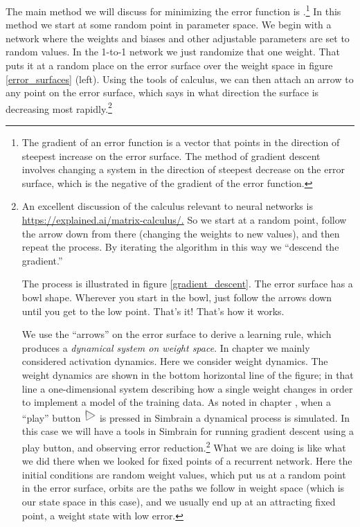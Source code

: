 The main method we will discuss for minimizing the error function is  .\footnote{The gradient of an error function is a vector that points in the direction of steepest increase on the error surface. The method of gradient descent involves changing a system in the direction of steepest decrease on the error surface, which is the negative of the gradient of the error function.}  In this method we start at some random point in parameter space. We begin with a network where the weights and biases and other adjustable parameters are set to random values. In the 1-to-1 network we just randomize that one weight. That puts it at a random place on the error surface over the weight space in figure \ref{error_surfaces} (left). Using the tools of calculus, we can then attach an arrow to any point on the error surface, which says in what direction the surface is decreasing most rapidly.\footnote{An excellent discussion of the calculus relevant to neural networks is \url{https://explained.ai/matrix-calculus/.} So we start at a random point, follow the arrow down from there (changing the weights to new values), and then repeat the process. By iterating the algorithm in this way we ``descend the gradient.''

The process is illustrated in figure \ref{gradient_descent}. The error surface has a bowl shape. Wherever you start in the bowl, just follow the arrows down until you get to the low point. That's it!  That's how it works. 

We use the ``arrows'' on the error surface to derive a learning rule, which produces a \emph{dynamical system on weight space}. In chapter  we mainly considered activation dynamics. Here we consider weight dynamics. The weight dynamics are shown in the bottom horizontal line of the figure; in that line a one-dimensional system describing how a single weight changes in order to implement a model of the training data. As noted in chapter , when a ``play''  button \includegraphics[scale=.5]{./images/Play.png} is pressed in Simbrain  a dynamical process is simulated. In this case we will have a tools in Simbrain for running gradient descent using a play button, and observing error reduction.\footnote{See the screenshot here: \url{http://www.simbrain.net/Documentation/v3/Pages/Network/training/trainingDialog.html}.} What we are doing is like what we did there when we looked for fixed points of a recurrent network. Here the initial conditions are random weight values, which put us at a random point in the error surface, orbits are the paths we follow in weight space (which is our state space in this case), and we usually end up  at an attracting fixed point, a weight state with low error. 

}
